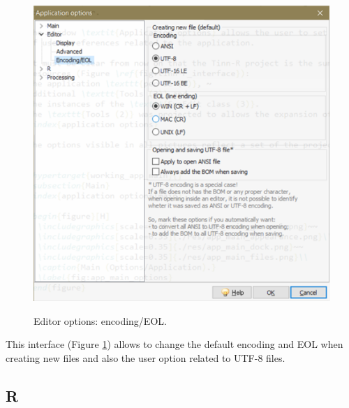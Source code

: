 \begin{figure}[H]
  \includegraphics[scale=.8]{./res/app_editor_encoding.png}\\
  \caption{Editor options: encoding/EOL.}
  \label{fig:editor_encoding}
\end{figure}

This interface
(Figure \ref{fig:editor_encoding})
allows to change the default encoding and EOL when creating new files and
also the user option related to UTF-8 files.


\hypertarget{working_app_r}{}
\subsection{R}

